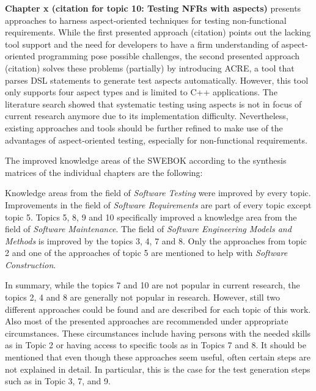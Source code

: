 \textbf{Chapter x (citation for topic 10: Testing NFRs with aspects)} presents approaches to harness aspect-oriented techniques for testing non-functional requirements. While the first presented approach (citation) points out the lacking tool support and the need for developers to have a firm understanding of aspect-oriented programming pose possible challenges, the second presented approach (citation) solves these problems (partially) by introducing ACRE, a tool that parses DSL statements to generate test aspects automatically. However, this tool only supports four aspect types and is limited to C++ applications. The literature search showed that systematic testing using aspects is not in focus of current research anymore due to its implementation difficulty. Nevertheless, existing approaches and tools should be further refined to make use of the advantages of aspect-oriented testing, especially for non-functional requirements. 


The improved knowledge areas of the SWEBOK according to the synthesis matrices of the individual chapters are the following:

Knowledge areas from the field of \textit{Software Testing} were improved by every topic. Improvements in the field of \textit{Software Requirements} are part of every topic except topic 5. Topics 5, 8, 9 and 10 specifically improved a knowledge area from the field of \textit{Software Maintenance}. The field of \textit{Software Engineering Models and Methods} is improved by the topics 3, 4, 7 and 8. Only the approaches from topic 2 and one of the approaches of topic 5 are mentioned to help with \textit{Software Construction}.

In summary, while the topics 7 and 10 are not popular in current research, the topics 2, 4 and 8 are generally not popular in research. However, still two different approaches could be found and are described for each topic of this work. Also most of the presented approaches are recommended under appropriate circumstances. These circumstances include having persons with the needed skills as in Topic 2 or having access to specific tools as in Topics 7 and 8. It should be mentioned that even though these approaches seem useful, often certain steps are not explained in detail. In particular, this is the case for the test generation steps such as in Topic 3, 7, and 9. 
